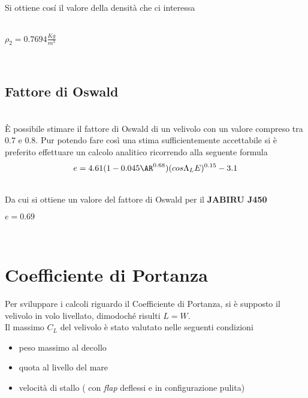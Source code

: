 \noindent \\ \\

Si ottiene cosí il valore della densità che ci interessa \\ \\

\begin{center}
${{\rho_2}={0.7694{\frac{Kg}{m^3}}}}$
\end {center}

\noindent \\ 

\subsection {Fattore di Oswald}

\noindent \\
È possibile stimare il fattore di Oswald di un velivolo con un valore compreso tra $0.7$ e $0.8$. Pur potendo fare così  una stima sufficientemente accettabile si è preferito effettuare un calcolo analitico ricorrendo alla seguente formula \cite{prof:brandt} \\ 


\begin{equation}
\label{eqn:coswald}
e= 4.61(1-0.045 {\AR}^{0.68})(cos{\Lambda}_LE)^{0.15}-3.1
\end{equation}

\noindent \\ 

Da cui si ottiene un valore del fattore di Oswald per il {\bfseries JABIRU J450} \\

\begin{center}
$ e= 0.69 $
\end {center}

\noindent \\

\section{ Coefficiente di Portanza}

Per sviluppare i calcoli riguardo il Coefficiente di Portanza, si è supposto il velivolo in volo livellato, dimodoché risulti $ L=W$. \\
Il massimo $C_L$ del velivolo è stato valutato nelle seguenti condizioni \\

\begin {itemize}
\item peso massimo al decollo
\item quota al livello del mare
\item velocità di stallo ( con {\itshape flap} deflessi e in configurazione pulita)
\end{itemize}

